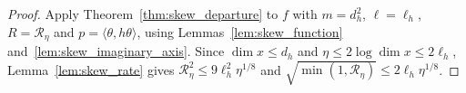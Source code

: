 \begin{proof}\leanok
    Apply Theorem~\ref{thm:skew_departure} to $f$ with $m=d_h^2$,
    $\ell=\ell_h$, $R=\mathcal R_\eta$ and $p=\langle\theta,h\theta\rangle$,
    using Lemmas~\ref{lem:skew_function} and~\ref{lem:skew_imaginary_axis}.
    Since $\dim x\le d_h$ and $\eta\le2\log\dim x\le2\ell_h$,
    Lemma~\ref{lem:skew_rate} gives
    $\mathcal R_\eta^2\le9\ell_h^2\eta^{1/8}$ and
    $\sqrt{\min(1,\mathcal R_\eta)}\le2\ell_h\eta^{1/8}$.
\end{proof}
